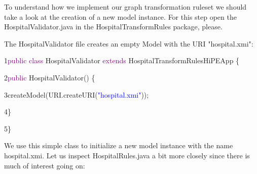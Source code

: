 To understand how we implement our graph transformation ruleset we should take a look at the creation of a new model instance. For this step open the \textsf{HospitalValidator.java} in the \textsf{HospitalTransformRules package}, please.\newline

The HospitalValidator file creates an empty Model with the URI \textsf{"hospital.xmi"}:\newline\newline

{

1\hspace{0.5cm}\textcolor{Purple}{public class} HospitalValidator \textcolor{Purple}{extends} HospitalTransformRulesHiPEApp  \{

2\hspace{1cm}\textcolor{Purple}{public} HospitalValidator() \{

3\hspace{1.5cm}createModel(URI.createURI(\textcolor{blue}{"hospital.xmi"}));

4\hspace{1cm}\}	

5\hspace{0.5cm}\}\newline

}

We use this simple class to initialize a new model instance with the name \textsf{hospital.xmi}.\newline
Let us inspect HospitalRules.java a bit more closely since there is much of interest going on:\newline\newline 


